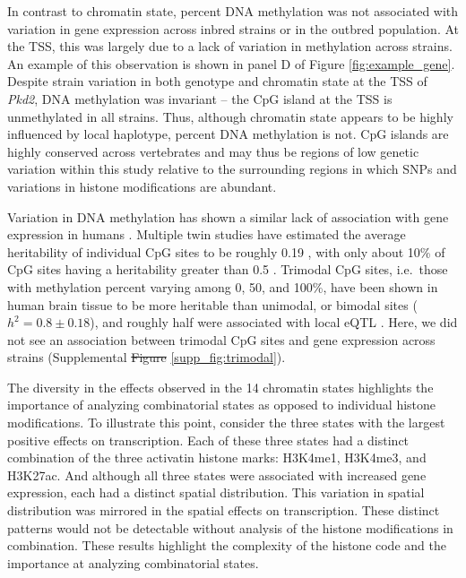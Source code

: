 \documentclass[
  11pt,
]{article}
\providecommand{\DIFaddtex}[1]{{\protect\color{blue}\uwave{#1}}} %
\providecommand{\DIFdeltex}[1]{{\protect\color{red}\sout{#1}}}                      %
\providecommand{\DIFaddbegin}{} %
\providecommand{\DIFaddend}{} %
\providecommand{\DIFdelbegin}{} %
\providecommand{\DIFdelend}{} %
\providecommand{\DIFadd}[1]{\texorpdfstring{\DIFaddtex{#1}}{#1}} %
\providecommand{\DIFdel}[1]{\texorpdfstring{\DIFdeltex{#1}}{}} %
\newcommand{\DIFscaledelfig}{0.5}
\newlength{\DIFdelgraphicswidth} %
\newlength{\DIFdelgraphicsheight} %
\newcommand{\DIFaddincludegraphics}[2][]{{\color{blue}\fbox{\DIFOincludegraphics[#1]{#2}}}} %
\newcommand{\DIFdelincludegraphics}[2][]{%
\sbox{\DIFdelgraphicsbox}{\DIFOincludegraphics[#1]{#2}}%
\settoboxwidth{\DIFdelgraphicswidth}{\DIFdelgraphicsbox} %
\settoboxtotalheight{\DIFdelgraphicsheight}{\DIFdelgraphicsbox} %
\scalebox{\DIFscaledelfig}{%
\parbox[b]{\DIFdelgraphicswidth}{\usebox{\DIFdelgraphicsbox}\\[-\baselineskip] \rule{\DIFdelgraphicswidth}{0em}}\llap{\resizebox{\DIFdelgraphicswidth}{\DIFdelgraphicsheight}{%
\setlength{\unitlength}{\DIFdelgraphicswidth}%
\begin{picture}(1,1)%
\thicklines\linethickness{2pt} %
{\color[rgb]{1,0,0}\put(0,0){\framebox(1,1){}}}%
{\color[rgb]{1,0,0}\put(0,0){\line( 1,1){1}}}%
{\color[rgb]{1,0,0}\put(0,1){\line(1,-1){1}}}%
\end{picture}%
}\hspace*{3pt}}} %
} %
\DeclareRobustCommand{\DIFaddbegin}{\DIFOaddbegin \let\includegraphics\DIFaddincludegraphics} %
\DeclareRobustCommand{\DIFaddend}{\DIFOaddend \let\includegraphics\DIFOincludegraphics} %
\DeclareRobustCommand{\DIFdelbegin}{\DIFOdelbegin \let\includegraphics\DIFdelincludegraphics} %
\DeclareRobustCommand{\DIFdelend}{\DIFOaddend \let\includegraphics\DIFOincludegraphics} %
\begin{document}
\DIFadd{in }\DIFaddend In contrast to chromatin state, percent DNA methylation was not
associated with variation in gene expression across inbred strains or in
the outbred population. At the TSS, this was largely due to a lack of
variation in methylation across strains. An example of this observation
is shown in panel D of Figure \ref{fig:example_gene}. Despite strain
variation in both genotype and chromatin state at the TSS of
\textit{Pkd2}, DNA methylation was invariant -- the CpG island at the
TSS is unmethylated in all strains. Thus, although chromatin state
appears to be highly influenced by local haplotype, percent DNA
methylation is not. CpG islands are highly conserved across vertebrates
\citep{papin2021cpg} and may thus be regions of low genetic variation
within this study relative to the surrounding regions in which SNPs and
variations in histone modifications are abundant.

Variation in DNA methylation has shown a similar lack of association
with gene expression in humans \citep{pmid33931130}. Multiple twin
studies have estimated the average heritability of individual CpG sites
to be roughly 0.19 \citep{pmid27051996, pmid24183450, pmid22532803},
with only about 10\% of CpG sites having a heritability greater than 0.5
\citep{pmid24183450, pmid22532803, pmid24887635}. Trimodal CpG sites,
i.e.~those with methylation percent varying among 0, 50, and 100\%, have
been shown in human brain tissue to be more heritable than unimodal, or
bimodal sites (\(h^2 = 0.8 \pm 0.18\)), and roughly half were associated
with local eQTL \citep{pmid20485568}. Here, we did not see an
association between trimodal CpG sites and gene expression across
strains (Supplemental \DIFdelbegin \DIFdel{Figure }\DIFdelend \DIFaddbegin \DIFadd{Fig. }\DIFaddend \ref{supp_fig:trimodal}).

The diversity in the effects observed in the 14 chromatin states
highlights the importance of analyzing combinatorial states as opposed
to individual histone modifications. To illustrate this point, consider
the three states with the largest positive effects on transcription.
Each of these three states had a distinct combination of the three
activatin histone marks: H3K4me1, H3K4me3, and H3K27ac. And although all
three states were associated with increased gene expression, each had a
distinct spatial distribution. This variation in spatial distribution
was mirrored in the spatial effects on transcription. These distinct
patterns would not be detectable without analysis of the histone
modifications in combination. These results highlight the complexity of
the histone code and the importance at analyzing combinatorial states.
\end{document}

